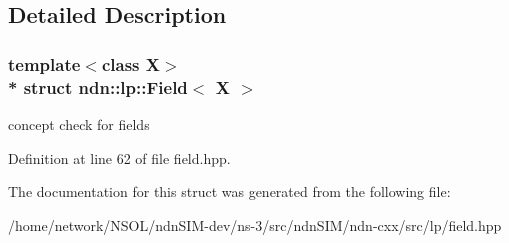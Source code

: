 \subsection{Detailed Description}
\subsubsection*{template$<$class X$>$\\*
struct ndn\+::lp\+::\+Field$<$ X $>$}

concept check for fields 

Definition at line 62 of file field.\+hpp.



The documentation for this struct was generated from the following file\+:\begin{DoxyCompactItemize}
\item 
/home/network/\+N\+S\+O\+L/ndn\+S\+I\+M-\/dev/ns-\/3/src/ndn\+S\+I\+M/ndn-\/cxx/src/lp/field.\+hpp\end{DoxyCompactItemize}
